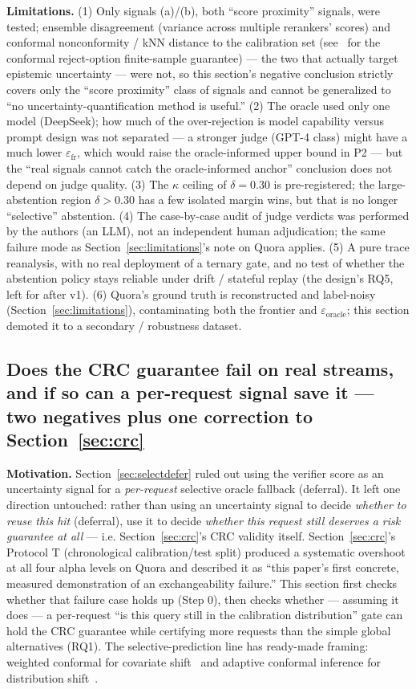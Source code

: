 \documentclass[11pt]{article}
\begin{document}
\textbf{Limitations.} (1) Only signals (a)/(b), both ``score proximity'' signals, were tested; ensemble disagreement (variance across multiple rerankers' scores) and conformal nonconformity / kNN distance to the calibration set (see~\cite{conformalreject} for the conformal reject-option finite-sample guarantee) --- the two that actually target epistemic uncertainty --- were not, so this section's negative conclusion strictly covers only the ``score proximity'' class of signals and cannot be generalized to ``no uncertainty-quantification method is useful.'' (2) The oracle used only one model (DeepSeek); how much of the over-rejection is model capability versus prompt design was not separated --- a stronger judge (GPT-4 class) might have a much lower $\varepsilon_\text{fr}$, which would raise the oracle-informed upper bound in P2 --- but the ``real signals cannot catch the oracle-informed anchor'' conclusion does not depend on judge quality. (3) The $\kappa$ ceiling of $\delta = 0.30$ is pre-registered; the large-abstention region $\delta > 0.30$ has a few isolated margin wins, but that is no longer ``selective'' abstention. (4) The case-by-case audit of judge verdicts was performed by the authors (an LLM), not an independent human adjudication; the same failure mode as Section~\ref{sec:limitations}'s note on Quora applies. (5) A pure trace reanalysis, with no real deployment of a ternary gate, and no test of whether the abstention policy stays reliable under drift / stateful replay (the design's RQ5, left for after v1). (6) Quora's ground truth is reconstructed and label-noisy (Section~\ref{sec:limitations}), contaminating both the frontier and $\varepsilon_\text{oracle}$; this section demoted it to a secondary / robustness dataset.

\subsection{Does the CRC guarantee fail on real streams, and if so can a per-request signal save it --- two negatives plus one correction to Section~\ref{sec:crc}}
\label{sec:crcgate}

\textbf{Motivation.} Section~\ref{sec:selectdefer} ruled out using the verifier score as an uncertainty signal for a \emph{per-request} selective oracle fallback (deferral). It left one direction untouched: rather than using an uncertainty signal to decide \emph{whether to reuse this hit} (deferral), use it to decide \emph{whether this request still deserves a risk guarantee at all} --- i.e. Section~\ref{sec:crc}'s CRC validity itself. Section~\ref{sec:crc}'s Protocol T (chronological calibration/test split) produced a systematic overshoot at all four alpha levels on Quora and described it as ``this paper's first concrete, measured demonstration of an exchangeability failure.'' This section first checks whether that failure case holds up (Step 0), then checks whether --- assuming it does --- a per-request ``is this query still in the calibration distribution'' gate can hold the CRC guarantee while certifying more requests than the simple global alternatives (RQ1). The selective-prediction line has ready-made framing: weighted conformal for covariate shift~\cite{weightedcp} and adaptive conformal inference for distribution shift~\cite{aci}.
\end{document}
